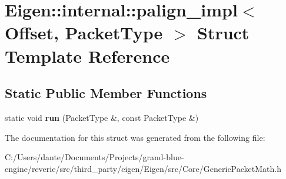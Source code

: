 \hypertarget{struct_eigen_1_1internal_1_1palign__impl}{}\section{Eigen\+::internal\+::palign\+\_\+impl$<$ Offset, Packet\+Type $>$ Struct Template Reference}
\label{struct_eigen_1_1internal_1_1palign__impl}
\subsection*{Static Public Member Functions}
\begin{DoxyCompactItemize}
\item 
\mbox{\label{struct_eigen_1_1internal_1_1palign__impl_a50d28052ed31511c0850d72acdc15d90}} 
static void {\bfseries run} (Packet\+Type \&, const Packet\+Type \&)
\end{DoxyCompactItemize}


The documentation for this struct was generated from the following file\+:\begin{DoxyCompactItemize}
\item 
C\+:/\+Users/dante/\+Documents/\+Projects/grand-\/blue-\/engine/reverie/src/third\+\_\+party/eigen/\+Eigen/src/\+Core/Generic\+Packet\+Math.\+h\end{DoxyCompactItemize}
